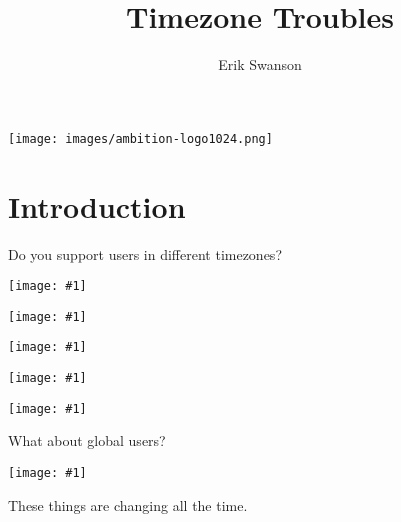 \documentclass[17pt,xcolor={dvipsnames}]{beamer}
\title{Timezone Troubles}
\author{Erik Swanson}
\newcommand {\slideimage}[1] {
  \begin{center}
    \texttt{[image: \#1]}
  \end{center}
}
\begin{document}
\begin{frame}
  \titlepage
  \begin{center}
    \texttt{[image: images/ambition-logo1024.png]}
  \end{center}
\end{frame}

\section{Introduction}

\begin{frame}
  \begin{center}
    Do you support users in different timezones?
  \end{center}
\end{frame}

\begin{frame}
  \slideimage{images/usMapFinal/us_time_zones_01.png}
\end{frame}

\begin{frame}
  \slideimage{images/usMapFinal/us_time_zones_02.png}
\end{frame}

\begin{frame}
  \slideimage{images/usMapFinal/us_time_zones_03.png}
\end{frame}

\begin{frame}
  \slideimage{images/usMapFinal/us_time_zones_04.png}
\end{frame}

\begin{frame}
  \slideimage{images/usMapFinal/us_time_zones_05.png}
\end{frame}

\begin{frame}
  \begin{center}
    What about global users?
  \end{center}
\end{frame}

\begin{frame}
  \slideimage{images/world_time_zones.png}
\end{frame}

\begin{frame}
  \begin{center}
    These things are changing all the time.
  \end{center}
\end{frame}
\end{document}
